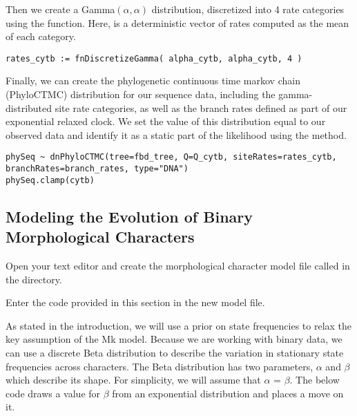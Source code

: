 Then we create a Gamma$(\alpha,\alpha)$ distribution, discretized into 4 rate categories using the  function.
Here,  is a deterministic vector of rates computed as the mean of each category.
{\tt \begin{snugshade*}
\begin{lstlisting}
rates_cytb := fnDiscretizeGamma( alpha_cytb, alpha_cytb, 4 )
\end{lstlisting}
\end{snugshade*}}

Finally, we can create the phylogenetic continuous time markov chain (PhyloCTMC) distribution for our sequence data, including the gamma-distributed site rate categories, as well as the branch rates defined as part of our exponential relaxed clock.
We set the value of this distribution equal to our observed data and identify it as a static part of the likelihood using the  method.
{\tt \begin{snugshade*}
\begin{lstlisting}
phySeq ~ dnPhyloCTMC(tree=fbd_tree, Q=Q_cytb, siteRates=rates_cytb, branchRates=branch_rates, type="DNA")
phySeq.clamp(cytb)
\end{lstlisting}
\end{snugshade*}}

\bigskip

\subsection{Modeling the Evolution of Binary Morphological Characters}\label{subsect:RB-ModelMorph}

{\begin{framed}
Open your text editor and create the morphological character model file called {\textcolor{red}{}} in the  directory.

Enter the \Rev code provided in this section in the new model file.
\end{framed}}

As stated in the introduction, we will use a prior on state frequencies to relax the key assumption of the Mk model. 
Because we are working with binary data, we can use a discrete Beta distribution to describe the variation in stationary state frequencies across characters. 
The Beta distribution has two parameters, $\alpha$ and $\beta$ which describe its shape. 
For simplicity, we will assume that $\alpha$ = $\beta$. 
The below code draws a value for $\beta$ from an exponential distribution and places a move on it.

